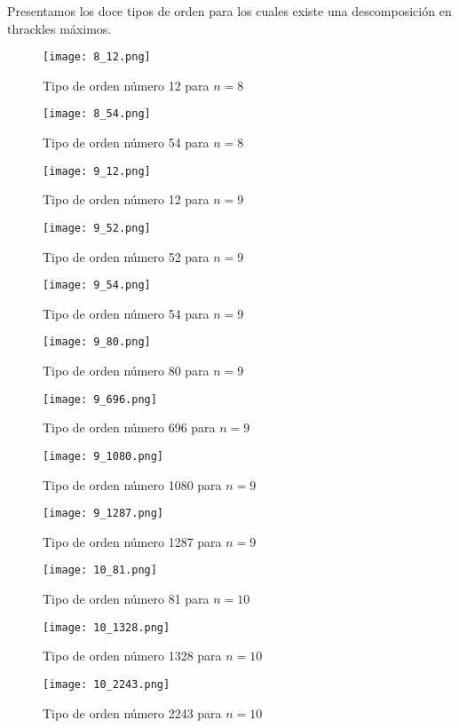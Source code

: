 Presentamos los doce tipos de orden para los cuales existe una descomposición en thrackles máximos.
\begin{figure}[h]
    \centering
    \texttt{[image: 8\_12.png]}
    \caption{Tipo de orden número 12 para $n=8$}
\end{figure}
\begin{figure}
    \centering
    \texttt{[image: 8\_54.png]}
    \caption{Tipo de orden número 54 para $n=8$}
\end{figure}
\begin{figure}
    \centering
    \texttt{[image: 9\_12.png]}
    \caption{Tipo de orden número 12 para $n=9$}
\end{figure}
\begin{figure}
    \centering
    \texttt{[image: 9\_52.png]}
    \caption{Tipo de orden número 52 para $n=9$}
\end{figure}
\begin{figure}
    \centering
    \texttt{[image: 9\_54.png]}
    \caption{Tipo de orden número 54 para $n=9$}
\end{figure}
\begin{figure}
    \centering
    \texttt{[image: 9\_80.png]}
    \caption{Tipo de orden número 80 para $n=9$}
\end{figure}
\begin{figure}
    \centering
    \texttt{[image: 9\_696.png]}
    \caption{Tipo de orden número 696 para $n=9$}
\end{figure}

\begin{figure}
    \centering
    \texttt{[image: 9\_1080.png]}
    \caption{Tipo de orden número 1080 para $n=9$}
\end{figure}
\begin{figure}
    \centering
    \texttt{[image: 9\_1287.png]}
    \caption{Tipo de orden número 1287 para $n=9$}
\end{figure}
\begin{figure}
    \centering
    \texttt{[image: 10\_81.png]}
    \caption{Tipo de orden número 81 para $n=10$}
\end{figure}
\begin{figure}
    \centering
    \texttt{[image: 10\_1328.png]}
    \caption{Tipo de orden número 1328 para $n=10$}
\end{figure}
\begin{figure}
    \centering
    \texttt{[image: 10\_2243.png]}
    \caption{Tipo de orden número 2243 para $n=10$}
\end{figure}
